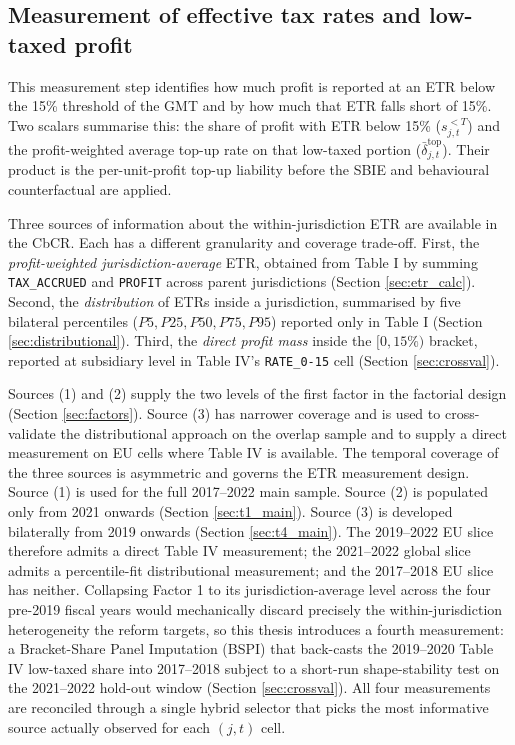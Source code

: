 \documentclass[11pt,a4paper]{article}
\newcommand{\code}[1]{\texttt{#1}}
\begin{document}
\subsection{Measurement of effective tax rates and low-taxed profit}\label{sec:etr_measurement}

This measurement step identifies how much profit is reported at an ETR below the 15\% threshold of the GMT and by how much that ETR falls short of 15\%. Two scalars summarise this: the share of profit with ETR below 15\% ($s_{j,t}^{<T}$) and the profit-weighted average top-up rate on that low-taxed portion ($\bar{\delta}_{j,t}^{\text{top}}$). Their product is the per-unit-profit top-up liability before the SBIE and behavioural counterfactual are applied.

Three sources of information about the within-jurisdiction ETR are available in the CbCR. Each has a different granularity and coverage trade-off. First, the \emph{profit-weighted jurisdiction-average} ETR, obtained from Table I by summing \code{TAX\_ACCRUED} and \code{PROFIT} across parent jurisdictions (Section \ref{sec:etr_calc}). Second, the \emph{distribution} of ETRs inside a jurisdiction, summarised by five bilateral percentiles ($P5, P25, P50, P75, P95$) reported only in Table I (Section \ref{sec:distributional}). Third, the \emph{direct profit mass} inside the $[0, 15\%)$ bracket, reported at subsidiary level in Table IV's \code{RATE\_0-15} cell (Section \ref{sec:crossval}).

Sources (1) and (2) supply the two levels of the first factor in the factorial design (Section \ref{sec:factors}). Source (3) has narrower coverage and is used to cross-validate the distributional approach on the overlap sample and to supply a direct measurement on EU cells where Table IV is available. The temporal coverage of the three sources is asymmetric and governs the ETR measurement design. Source (1) is used for the full 2017--2022 main sample. Source (2) is populated only from 2021 onwards (Section \ref{sec:t1_main}). Source (3) is developed bilaterally from 2019 onwards (Section \ref{sec:t4_main}). The 2019--2022 EU slice therefore admits a direct Table IV measurement; the 2021--2022 global slice admits a percentile-fit distributional measurement; and the 2017--2018 EU slice has neither. Collapsing Factor 1 to its jurisdiction-average level across the four pre-2019 fiscal years would mechanically discard precisely the within-jurisdiction heterogeneity the reform targets, so this thesis introduces a fourth measurement: a Bracket-Share Panel Imputation (BSPI) that back-casts the 2019--2020 Table IV low-taxed share into 2017--2018 subject to a short-run shape-stability test on the 2021--2022 hold-out window (Section \ref{sec:crossval}). All four measurements are reconciled through a single hybrid selector that picks the most informative source actually observed for each $(j,t)$ cell.
\end{document}
